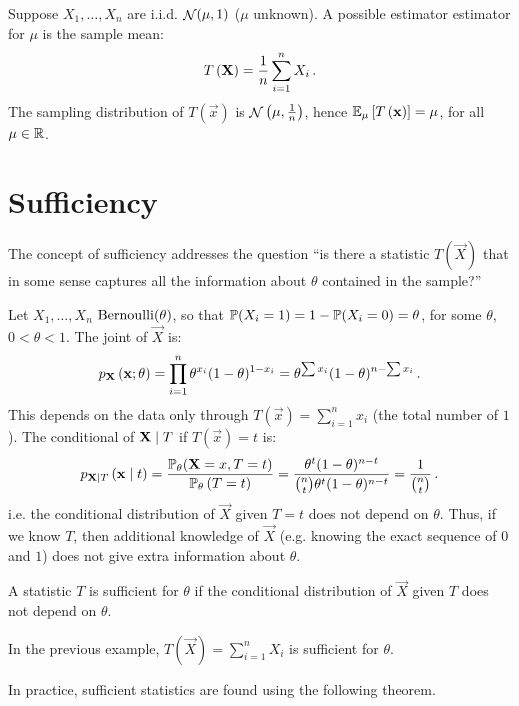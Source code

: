
\begin{example}
Suppose $X_1, \dotsc, X_n$ are i.i.d. $\mathop{\mathcal{N}}(\mu, 1)$ ($\mu$ unknown). A possible estimator estimator for $\mu$ is the sample mean:
\[
 T\left(\mathbf{X}\right) = \frac{1}{n}\sum_{i=1}^n X_i \, {.}
\]
The sampling distribution of $T\left(\vec{x}\right)$ is $\mathop{\mathcal{N}}\left(\mu, \frac{1}{n}\right)$, hence $\mathbb{E}_\mu \left[ T\left(\mathbf{x}\right) \right] = \mu$, for all $\mu \in \mathbb{R}$.
\end{example}

\section{Sufficiency}
The concept of sufficiency addresses the question ``is there a statistic $T\left(\vec{X}\right)$ that in some sense captures all the information about $\theta$ contained in the sample?''

\begin{example}[label=example:1.2]
Let $X_1, \dotsc, X_n$ \iid $\operatorname{Bernoulli}(\theta)$, so that $\mathbb{P}(X_i = 1) = 1 - \mathbb{P}(X_i = 0) = \theta$, for some $\theta$, $0 < \theta < 1$. The joint \pmf of $\vec{X}$ is:
\[
p_{\mathbf{X}}\left(\mathbf{x}; \theta\right) = \prod_{i = 1}^n \theta^{x_i}(1-\theta)^{1-x_i} = \theta^{\sum x_i}(1 - \theta)^{n - \sum x_i} \, {.}
\]
This depends on the data only through $T\left(\vec{x}\right) = \sum_{i=1}^n x_i$ (the total number of $1$). The conditional \pmf of $\mathbf{X} \mid T$ if $T\left(\vec{x}\right) = t$ is:
\[
p_{\mathbf{X} \mid T} \left( \mathbf{x} \mid t\right) = \frac{\mathbb{P}_\theta(\mathbf{X} = x, T = t)}{\mathbb{P}_\theta\left(T = t\right)} = \frac{\theta^t(1-\theta)^{n-t}}{\binom{n}{t}\theta^t(1-\theta)^{n-t}} = \frac{1}{\binom{n}{t}} \, {.}
\]
i.e. the conditional distribution of $\vec{X}$ given $T = t$ does not depend on $\theta$. Thus, if we know $T$, then additional knowledge of $\vec{X}$ (e.g. knowing the exact sequence of $0$ and $1$) does not give extra information about $\theta$.
\end{example}

\begin{definition}
  A statistic $T$ is sufficient for $\theta$ if the conditional distribution of $\vec{X}$ given $T$ does not depend on $\theta$.
\end{definition}

In the previous example, $T\left(\vec{X}\right) = \sum_{i=1}^n X_i$ is sufficient for $\theta$.

In practice, sufficient statistics are found using the following theorem.

